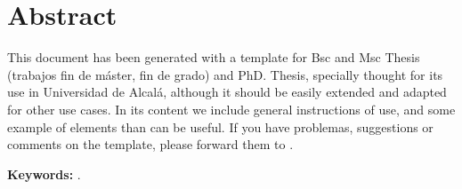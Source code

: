 %

\chapter*{Abstract}
\label{cha:abstract}


This document has been generated with a template for Bsc and Msc Thesis (trabajos fin de máster, fin de grado) and PhD. Thesis, specially thought for its use in Universidad de Alcalá, although it should be easily extended and adapted for other use cases. In its content we include general instructions of use, and some example of elements than can be useful. If you have problemas, suggestions or comments on the template, please forward them to \contactauthor.


\textbf{Keywords:} \myThesisKeywordsEnglish.



